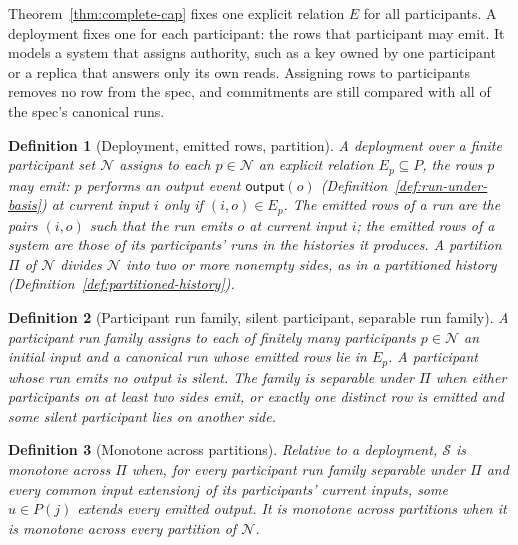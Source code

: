 \documentclass[sigconf]{cidr-2027}
\newtheorem{definition}{Definition}
\theoremstyle{remark}
\newcommand{\commitments}{commitments\xspace}
\newcommand{\indesc}{input extension\xspace} %
\newcommand{\outrel}{extends\xspace}          %
\newcommand{\Spec}{\mathcal{S}}
\newcommand{\fiber}[1]{P(#1)}
\begin{document}
Theorem~\ref{thm:complete-cap} fixes one explicit relation $E$ for all
participants. A deployment fixes one for each participant: the rows that
participant may emit. It models a system that assigns authority, such as a
key owned by one participant or a replica that answers only its own reads. Assigning rows to participants removes no row from the spec, and
\commitments are still compared with all of the spec's canonical runs.

\begin{definition}[Deployment, emitted rows, partition]
\label{def:deployment}\label{def:emitted-rows}
A \emph{deployment} over a finite participant set $\mathcal N$ assigns to each $p\in\mathcal N$
an explicit relation $E_p\subseteq P$, the rows $p$ may emit: $p$ performs an output event
$\mathsf{output}(o)$ (Definition~\ref{def:run-under-basis}) at current input
$i$ only if $(i,o)\in E_p$. The \emph{emitted rows} of a run are the
pairs $(i,o)$ such that the run emits $o$ at current input $i$; the emitted
rows of a system are those of its participants' runs in the histories it
produces. A \emph{partition} $\Pi$ of $\mathcal N$ divides $\mathcal N$ into
two or more nonempty sides, as in a partitioned history
(Definition~\ref{def:partitioned-history}).
\end{definition}

\begin{definition}[Participant run family, silent participant, separable run family]
\label{def:participant-run-family}
A \emph{participant run family} assigns to each of finitely many participants
$p\in\mathcal N$ an initial input and a canonical run whose emitted rows lie in $E_p$. A participant whose run emits no output is \emph{silent}. The family is
\emph{separable under $\Pi$} when either participants on at least two
sides emit, or exactly one distinct row is emitted and some silent
participant lies on another side.
\end{definition}

\begin{definition}[Monotone across partitions]
\label{def:monotone-across-partitions}
Relative to a deployment, $\Spec$ is \emph{monotone across $\Pi$} when, for
every participant run family separable under $\Pi$ and every common \indesc $j$
of its participants' current inputs, some $u\in\fiber{j}$ \outrel every
emitted output. It is \emph{monotone across partitions} when it is monotone
across every partition of $\mathcal N$.
\end{definition}
\end{document}
